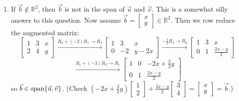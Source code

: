 \documentclass[12pt,letterpaper]{article}
\begin{document}
\begin{enumerate}
\begin{enumerate}
  \item If $\vec{b}\notin \mathbb{R}^2$, then $\vec{b}$ is not in the span of $\vec{u}$ and $\vec{v}$. This is a somewhat silly answer to this question. Now assume $\vec{b}=\left[\begin{array}{c} x\\y\end{array}\right] \in \mathbb{R}^2$. Then we row reduce the augmented matrix:
    \[
      \left[
        \begin{array}{cc|c}
          1&3&x\\
          2&4&y
        \end{array}
      \right]\xrightarrow{R_2+(-2)R_1\rightarrow R_2}
      \left[
        \begin{array}{cc|c}
          1&3&x\\
          0&-2&y-2x
        \end{array}
      \right]\xrightarrow{-\frac{1}{2}R_2\rightarrow R_2}
      \left[
        \begin{array}{cc|c}
          1&3&x\\
          0&1&\frac{2x-y}{2}
        \end{array}
      \right]
    \]
    \[
      \xrightarrow{R_1+(-3)R_2\rightarrow R_1}\left[
        \begin{array}{cc|c}
          1&0&-2x+\frac{3}{2}y\\
          0&1&\frac{2x-y}{2}
        \end{array}
      \right]      
    \]
    so $\vec{b}\in\operatorname{span}\{\vec{u},\vec{v}\}$. (Check $(-2x+\frac{3}{2}y)\left[\begin{array}{c} 1\\2\end{array}\right]+\frac{2x-y}{2}\left[\begin{array}{c} 3\\4\end{array}\right]=\left[\begin{array}{c} x\\y\end{array}\right]=\vec{b}$.)
    
  \end{enumerate}
  
\end{enumerate}
\end{document}
